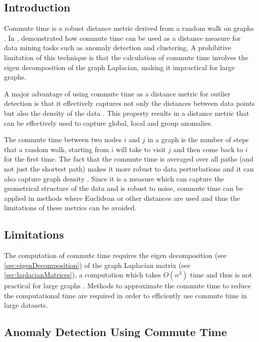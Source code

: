 \subsection{Introduction}
\label{sec:commuteTimeIntroduction}
Commute time is a robust distance metric derived from a random walk on graphs 
\cite{Khoa:2012}. In , \citeauthor{Khoa:2012} demonstrated 
how commute time can be used as a distance measure for data mining tasks such as
anomaly detection and clustering. A prohibitive limitation of this technique is 
that the calculation of commute time involves the eigen decomposition of the 
graph Laplacian, making it impractical for large graphs.

A major advantage of using commute time as a distance metric for outlier 
detection is that it effectively captures not only the distances between data 
points but also the density of the data \citeNeeded{}. This property results in 
a distance metric that can be effectively used to capture global, local and 
group anomalies.

The commute time between two nodes $i$ and $j$ in a graph is the number of steps
that a random walk, starting from $i$ will take to visit $j$ and then come back 
to $i$ for the first time. The fact that the commute time is averaged over all 
paths (and not just the shortest path) makes it more robust to data 
perturbations and it can also capture graph density \cite{Khoa:2012}. Since it 
is a measure which can capture the geometrical structure of the data and is 
robust to noise, commute time can be applied in methods where Euclidean or other
distances are used and thus the limitations of these metrics can be avoided.

\subsection{Limitations}
\label{sec:commuteTime:limitations}
The computation of commute time requires the eigen decomposition (see 
\autoref{sec:eigenDecomposition}) of the graph Laplacian matrix (see 
\autoref{sec:laplacianMatrices}), a computation which takes $O(n^{3})$ time and 
thus is not practical for large graphs \citeNeeded{}. Methods to approximate the
commute time to reduce the computational time are required in order to 
efficiently use commute time in large datasets.

\subsection{Anomaly Detection Using Commute Time}
\label{sec:anomalyDetectionUsingCommuteTime}
